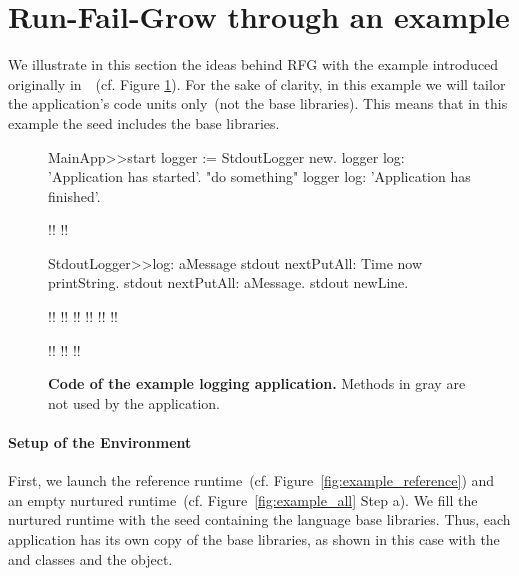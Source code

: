 

\section{Run-Fail-Grow through an example}\label{sec:rfg_example}
We illustrate in this section the ideas behind RFG with the example introduced originally in~~(cf. Figure \ref{fig:code_example_again}). For the sake of clarity, in this example we will tailor the application's code units only~(\ie not the base libraries). This means that in this example the seed includes the base libraries.

\begin{figure}[ht]
\begin{code}
MainApp>>start
    logger := StdoutLogger new.
    logger log: 'Application has started'.
    "do something"
    logger log: 'Application has finished'.

!!
!!

StdoutLogger>>log: aMessage
    stdout nextPutAll: Time now printString.
    stdout nextPutAll: aMessage.
    stdout newLine.
    
!!
!!
!!
!!
!!
!!

!!
!!
!!
\end{code}

\caption{\textbf{Code of the example logging application.} Methods in gray are not used by the application.\label{fig:code_example_again}}
\end{figure}


\paragraph{Setup of the Environment} First, we launch the reference runtime~(cf. Figure~\ref{fig:example_reference}) and an empty nurtured runtime~(cf. Figure~\ref{fig:example_all} Step a). We fill the nurtured runtime with the seed containing the language base libraries. Thus, each application has its own copy of the base libraries, as shown in this case with the  and  classes and the  object.

